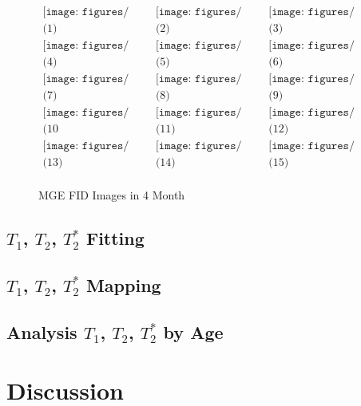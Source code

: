 \documentclass[10pt, a4paper]{article}
\begin{document}
				\begin{figure}[htbp]
					\centering
					$\begin{array}{ccc}
						\texttt{[image: figures/MGE\_4month/mge\_4month\_1.png]}
						&
						\texttt{[image: figures/MGE\_4month/mge\_4month\_2.png]}
						&
						\texttt{[image: figures/MGE\_4month/mge\_4month\_3.png]}
						\\
						\mbox{(1)} & \mbox{(2)} & \mbox{(3)} \\
						
						\texttt{[image: figures/MGE\_4month/mge\_4month\_4.png]}
						&
						\texttt{[image: figures/MGE\_4month/mge\_4month\_5.png]}
						&
						\texttt{[image: figures/MGE\_4month/mge\_4month\_6.png]}
						\\
						\mbox{(4)} & \mbox{(5)} & \mbox{(6)} \\
						
						\texttt{[image: figures/MGE\_4month/mge\_4month\_7.png]}
						&
						\texttt{[image: figures/MGE\_4month/mge\_4month\_8.png]}
						&
						\texttt{[image: figures/MGE\_4month/mge\_4month\_9.png]}
						\\
						\mbox{(7)} & \mbox{(8)} & \mbox{(9)} \\
						
						\texttt{[image: figures/MGE\_4month/mge\_4month\_10.png]}
						&
						\texttt{[image: figures/MGE\_4month/mge\_4month\_11.png]}
						&
						\texttt{[image: figures/MGE\_4month/mge\_4month\_12.png]}
						\\
						\mbox{(10} & \mbox{(11)} & \mbox{(12)} \\
						
						\texttt{[image: figures/MGE\_4month/mge\_4month\_13.png]}
						&
						\texttt{[image: figures/MGE\_4month/mge\_4month\_14.png]}
						&
						\texttt{[image: figures/MGE\_4month/mge\_4month\_15.png]}
						\\
						\mbox{(13)} & \mbox{(14)} & \mbox{(15)} \\
					\end{array}$
					\caption{MGE FID Images in 4 Month}
					\label{fig:mge_4month_image}
				\end{figure}
		
		\subsection{$T_1$, $T_2$, $T_2^*$ Fitting}
		
		\subsection{$T_1$, $T_2$, $T_2^*$ Mapping}
		
		\subsection{Analysis $T_1$, $T_2$, $T_2^*$  by Age}
	
	\section{Discussion}
	
	
	
\end{document}

